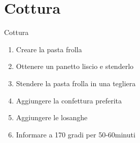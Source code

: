 \section{Cottura}  
\begin{frame}{Cottura}
  \begin{enumerate}
    \item Creare la pasta frolla
    \item Ottenere un panetto liscio e stenderlo
    \item Stendere la pasta frolla in una tegliera
    \item Aggiungere la confettura preferita
    \item Aggiungere le losanghe
    \item Informare a 170 gradi per 50-60minuti
  \end{enumerate}
\end{frame}

